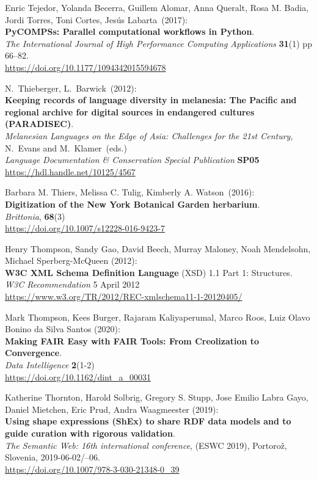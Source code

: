 \begin{thebibliography}{9}
Enric Tejedor, Yolanda Becerra, Guillem Alomar, Anna Queralt,
Rosa M. Badia, Jordi Torres, Toni Cortes, Jesús Labarta~(2017):\\
\textbf{PyCOMPSs: Parallel computational workflows in Python}.\\
\emph{The International Journal of High Performance Computing Applications}
\textbf{31}(1) pp 66--82.\\
\url{https://doi.org/10.1177/1094342015594678}


N.~Thieberger, L.~Barwick~(2012):\\
\textbf{Keeping records of language diversity in melanesia: The Pacific
and regional archive for digital sources in endangered cultures
(PARADISEC)}.\\
\emph{Melanesian Languages on the Edge of Asia:
Challenges for the 21st Century}, N.~Evans and M.~Klamer~(eds.)\\
\emph{Language Documentation \& Conservation Special Publication}
\textbf{SP05} \\
\url{https://hdl.handle.net/10125/4567}

Barbara M. Thiers, Melissa C. Tulig, Kimberly A. Watson~(2016):\\
\textbf{Digitization of the New York Botanical Garden herbarium}.\\
\emph{Brittonia}, \textbf{68}(3)\\
\url{https://doi.org/10.1007/s12228-016-9423-7}


Henry Thompson, Sandy Gao, David Beech, Murray Maloney, Noah Mendelsohn, Michael Sperberg-McQueen (2012):\\
\textbf{W3C XML Schema Definition Language} ({XSD}) 1.1 {Part} 1: {Structures}. \\
\emph{W3C Recommendation} 5 April 2012 \\
\url{https://www.w3.org/TR/2012/REC-xmlschema11-1-20120405/}

Mark Thompson, Kees Burger, Rajaram Kaliyaperumal, Marco Roos, Luiz Olavo Bonino da Silva Santos (2020):\\
\textbf{Making FAIR Easy with FAIR Tools: From Creolization to Convergence}.\\
\emph{Data Intelligence} \textbf{2}(1-2)\\
\url{https://doi.org/10.1162/dint_a_00031}

Katherine Thornton, Harold Solbrig, Gregory S. Stupp, Jose Emilio Labra
Gayo, Daniel Mietchen, Eric Prud, Andra Waagmeester (2019):\\
\textbf{Using shape expressions ({ShEx}) to share {RDF} data models and
to guide curation with rigorous validation}. \\
\emph{The Semantic Web: 16th international conference}, (ESWC 2019), Portorož, Slovenia,
2019-06-02/--06.\\
\url{https://doi.org/10.1007/978-3-030-21348-0_39}



\end{thebibliography}
